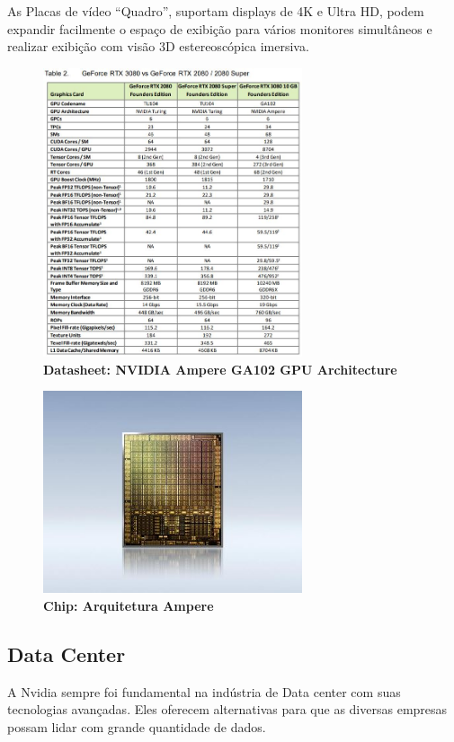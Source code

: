 \documentclass[conference]{IEEEtran}
\begin{document}
As Placas de vídeo “Quadro”, suportam displays de 4K e Ultra HD, podem expandir facilmente o espaço de exibição para vários monitores simultâneos e realizar exibição com visão 3D estereoscópica imersiva.

\begin{figure}[h]
\centerline{\includegraphics[width = 3.0in]{tabelafodase.jpg}}
\caption{\textbf{Datasheet: NVIDIA Ampere GA102 GPU Architecture}}
\label{figAM9300}
\end{figure}

\begin{figure}[h]
\centerline{\includegraphics[width = 3.0in]{chipfodase.JPG}}
\caption{\textbf{Chip: Arquitetura Ampere}}
\label{figAM9300}
\end{figure}

\subsection{\textbf{Data Center}}  A Nvidia sempre foi fundamental na indústria de Data center com suas tecnologias avançadas. Eles oferecem alternativas para que as diversas empresas possam lidar com grande quantidade de dados.
\end{document}
